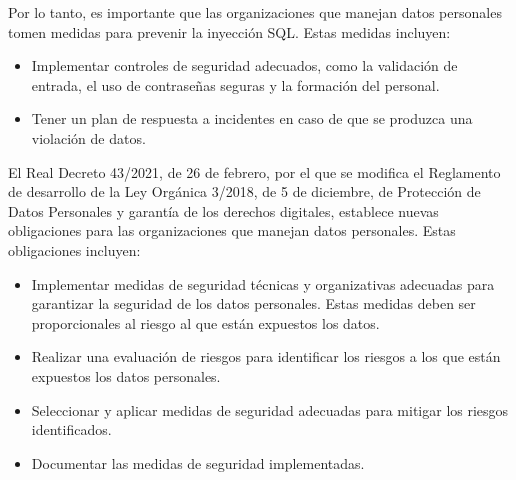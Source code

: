 \documentclass[11pt]{report}
\begin{document}
\cleardoublepage

Por lo tanto, es importante que las organizaciones que manejan datos personales tomen medidas para prevenir la inyección SQL. Estas medidas incluyen:
\begin{itemize}
  \item Implementar controles de seguridad adecuados, como la validación de entrada, el uso de contraseñas seguras y la formación del personal.
  \item Tener un plan de respuesta a incidentes en caso de que se produzca una violación de datos.
\end{itemize}

El Real Decreto 43/2021, de 26 de febrero, por el que se modifica el Reglamento de desarrollo de la Ley Orgánica 3/2018, de 5 de diciembre, de Protección
de Datos Personales y garantía de los derechos digitales, establece nuevas obligaciones para las organizaciones que manejan datos personales. Estas obligaciones incluyen:
\begin{itemize}
  \item Implementar medidas de seguridad técnicas y organizativas adecuadas para garantizar la seguridad de los datos personales. Estas medidas deben ser proporcionales
  al riesgo al que están expuestos los datos.
  \item Realizar una evaluación de riesgos para identificar los riesgos a los que están expuestos los datos personales.
  \item Seleccionar y aplicar medidas de seguridad adecuadas para mitigar los riesgos identificados.
  \item Documentar las medidas de seguridad implementadas.
\end{itemize}
\end{document}
